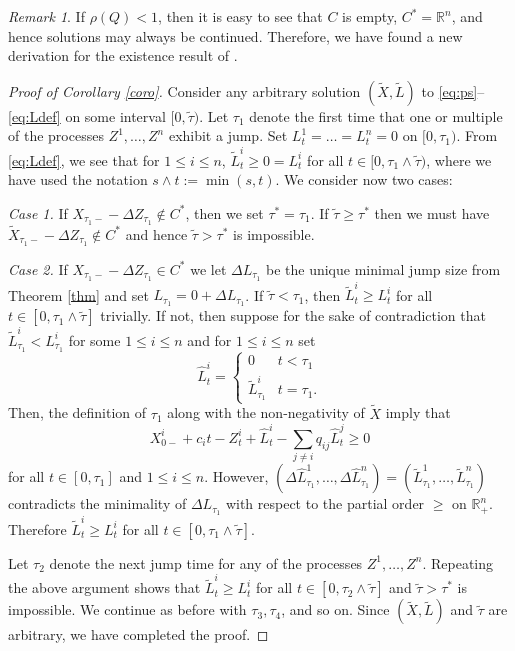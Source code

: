 \documentclass[12pt]{article}
\newcommand{\R}{\mathbb{R}}
\newcommand{\wt}{\widetilde}
\newcommand{\wh}{\widehat}
\theoremstyle{plain}
\theoremstyle{definition}
\theoremstyle{remark}
\newtheorem{remark}{Remark}
\begin{document}
\begin{remark}
If $\rho(Q)<1$, then it is easy to see that $C$ is empty, $C^*=\R^n$, and hence solutions may always be continued. Therefore, we have found a new derivation for the existence result of \cite[Proposition 1]{reiman_open_1984}.
\end{remark}

\begin{proof}[Proof of Corollary \ref{coro}]
Consider any arbitrary solution  $(\wt{X},\wt{L})$ to \eqref{eq:ps}--\eqref{eq:Ldef} on some interval $[0,\wt\tau)$.
Let $\tau_1$ denote the first time that one or multiple of the processes $Z^1,\dots,Z^n$ exhibit a jump. Set $L^1_t=\dots =L^n_t=0$ on $[0,\tau_1)$. From \eqref{eq:Ldef}, we see that for $1\le i\le n$, $\wt{L}^i_t\ge 0=L^i_t$ for all $t\in [0,\tau_1\wedge \wt\tau)$, where we have used the notation $s\wedge t:=\min(s,t)$. We consider now two cases:

\medskip

\emph{Case 1.} If $X_{\tau_1-}-\Delta Z_{\tau_1} \notin C^*$, then we set $\tau^*=\tau_1$. If $\wt\tau \ge \tau^*$ then we must have $\wt{X}_{\tau_1-}-\Delta Z_{\tau_1} \notin C^*$ and hence $\wt\tau > \tau^*$ is impossible.

\medskip

\emph{Case 2.} If $X_{\tau_1-}-\Delta Z_{\tau_1} \in C^*$ we let $\Delta L_{\tau_1}$ be the unique minimal jump size from Theorem \ref{thm} and set $L_{\tau_1}=0+\Delta L_{\tau_1}$.
If $\wt\tau < \tau_1$, then $\wt{L}^i_t\ge L^i_t$ for all $t\in [0,\tau_1\wedge \wt\tau]$ trivially. If not, then suppose for the sake of contradiction that $\wt{L}^i_{\tau_1}< L^i_{\tau_1}$ for some $1\le i\le n$ and for $1\le i \le n$ set 
\begin{equation*}
\wh{L}^i_t=\begin{cases}
0&t<\tau_1\\
\wt{L}^i_{\tau_1} & t=\tau_1.
\end{cases}
\end{equation*}
Then, the definition of $\tau_1$ along with the non-negativity of $\wt{X}$ imply that
\begin{equation*}
X_{0-}^i+c_it-Z^i_t+\wh{L}^i_t-\sum_{j\neq i}q_{ij} \wh{L}^j_t\ge 0
\end{equation*}
for all $t\in[0,\tau_1]$ and $1\le i\le n$. However, $(\Delta\wh{L}^1_{\tau_1},\dots,\Delta\wh{L}^n_{\tau_1})=(\wt{L}^1_{\tau_1},\dots, \wt{L}^n_{\tau_1})$ contradicts the minimality of $\Delta L_{\tau_1}$ with respect to the partial order $\ge$ on $\R_+^n$. Therefore $\wt{L}^i_t\ge L^i_t$ for all $t\in [0,\tau_1\wedge \wt\tau]$. 

\medskip

Let $\tau_2$ denote the next jump time for any of the processes $Z^1,\dots,Z^n$. Repeating the above argument shows that $\wt{L}^i_t\ge L^i_t$ for all $t\in [0,\tau_2\wedge \wt\tau]$ and $\wt\tau > \tau^*$ is impossible. We continue as before with $\tau_3,\tau_4$, and so on. Since $(\wt{X},\wt{L})$ and $\wt\tau$ are arbitrary, we have completed the proof. \qedhere
\end{proof}
\end{document}

